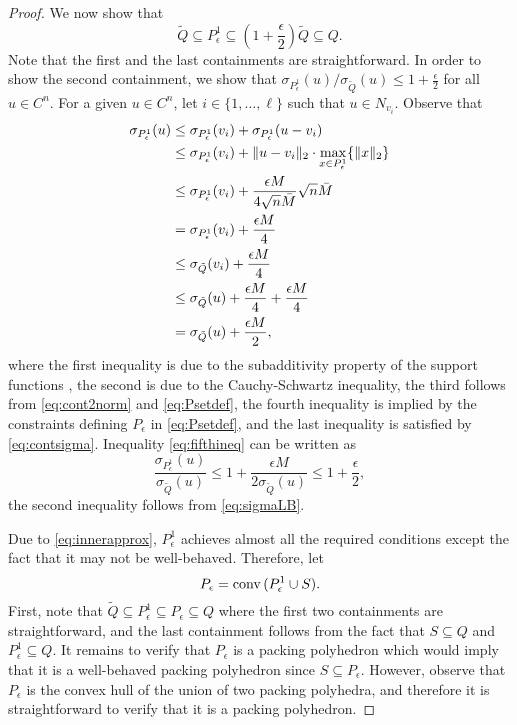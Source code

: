 \documentclass[11pt]{article}
\DeclareMathOperator{\conv}{conv}
\newcommand{\cred}{\color{black}}
\def\conv{\mathop{\rm conv}}
\begin{document}
\begin{proof}
We now show that 
\begin{equation}
\label{eq:innerapprox}
\tilde{Q} \subseteq P^1_\epsilon \subseteq (1+\frac{\epsilon}{2}) \tilde{Q} \subseteq Q.
\end{equation}
Note that the first and the last containments are straightforward. In order to show the second containment, we {\cred show} that $\sigma_{P^1_\epsilon}(u) / \sigma_{\tilde{Q}}(u) \leq 1+\frac{\epsilon}{2}$ for all $u \in C^n$. For a given $u \in C^n$, let $i \in \{ 1, \hdots,\ell\}$ such that $u \in N_{v_i}$. Observe that 
\begin{align}
\sigma_{P^1_\epsilon}(u) & \leq \sigma_{P^1_\epsilon}(v_i) + \sigma_{P^1_\epsilon}(u-v_i) \nonumber \\
& \leq \sigma_{P^1_\epsilon}(v_i) + \| u - v_i \|_2 \cdot \max_{x \in P^1_\epsilon} \{ \| x \|_2 \} \nonumber \\
& \leq \sigma_{P^1_\epsilon}(v_i) + \frac{\epsilon M}{{\cred 4} \sqrt{n} \bar{M}} \sqrt{n} \bar{M} \nonumber \\
& = \sigma_{P^1_\epsilon}(v_i) + \frac{\epsilon M}{4} \nonumber \\
& \leq \sigma_{\tilde{Q}}(v_i) + \frac{\epsilon M}{4} \nonumber \\
& \leq \sigma_{\tilde{Q}}(u) + \frac{\epsilon M}{4} + \frac{\epsilon M}{4} \nonumber \\
& = \sigma_{\tilde{Q}}(u) + \frac{\epsilon M}{2},  \label{eq:fifthineq} 
\end{align}
where the first inequality is due to the subadditivity property of the support functions \cite{rockafellar:1970}, the second is due to the Cauchy-Schwartz inequality, the third follows from \eqref{eq:cont2norm} and \eqref{eq:Psetdef}, the fourth inequality is implied by the constraints defining $P_\epsilon$ in \eqref{eq:Psetdef}, and the last inequality is satisfied by \eqref{eq:contsigma}. Inequality \eqref{eq:fifthineq} can be written as
$$\frac{\sigma_{P^1_\epsilon}(u)}{\sigma_{\tilde{Q}}(u)} \leq 1+ \frac{\epsilon M}{2 \sigma_{\tilde{Q}}(u)} \leq 1+ \frac{\epsilon}{2},$$
{\cred the second inequality} follows from  \eqref{eq:sigmaLB}.

Due to \eqref{eq:innerapprox}, $P^1_\epsilon$ achieves almost all the required conditions except the fact that it may not be well-behaved. Therefore, let 
$$P_\epsilon = \conv{(P^1_\epsilon \cup S)}.$$
First, note that $\tilde{Q} \subseteq P^1_\epsilon \subseteq P_\epsilon \subseteq Q$ where the first two containments are straightforward, and the last containment follows from the fact that $S \subseteq Q$ and $P^1_\epsilon \subseteq Q$. It remains to verify that $P_\epsilon$ is a packing polyhedron which would imply that it is {\cred a} well-behaved packing polyhedron since $S \subseteq P_\epsilon$. However, observe that $P_\epsilon$ is the convex hull of the union of two packing polyhedra, and therefore it is straightforward to verify that it is a packing polyhedron.


\end{proof}
\end{document}
